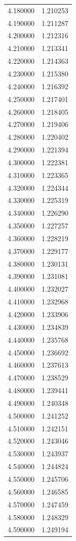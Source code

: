 \begin{tabular}{rr}
4.180000 & 1.210253 \\
4.190000 & 1.211287 \\
4.200000 & 1.212316 \\
4.210000 & 1.213341 \\
4.220000 & 1.214363 \\
4.230000 & 1.215380 \\
4.240000 & 1.216392 \\
4.250000 & 1.217401 \\
4.260000 & 1.218405 \\
4.270000 & 1.219406 \\
4.280000 & 1.220402 \\
4.290000 & 1.221394 \\
4.300000 & 1.222381 \\
4.310000 & 1.223365 \\
4.320000 & 1.224344 \\
4.330000 & 1.225319 \\
4.340000 & 1.226290 \\
4.350000 & 1.227257 \\
4.360000 & 1.228219 \\
4.370000 & 1.229177 \\
4.380000 & 1.230131 \\
4.390000 & 1.231081 \\
4.400000 & 1.232027 \\
4.410000 & 1.232968 \\
4.420000 & 1.233906 \\
4.430000 & 1.234839 \\
4.440000 & 1.235768 \\
4.450000 & 1.236692 \\
4.460000 & 1.237613 \\
4.470000 & 1.238529 \\
4.480000 & 1.239441 \\
4.490000 & 1.240348 \\
4.500000 & 1.241252 \\
4.510000 & 1.242151 \\
4.520000 & 1.243046 \\
4.530000 & 1.243937 \\
4.540000 & 1.244824 \\
4.550000 & 1.245706 \\
4.560000 & 1.246585 \\
4.570000 & 1.247459 \\
4.580000 & 1.248329 \\
4.590000 & 1.249194 \\

\end{tabular}
